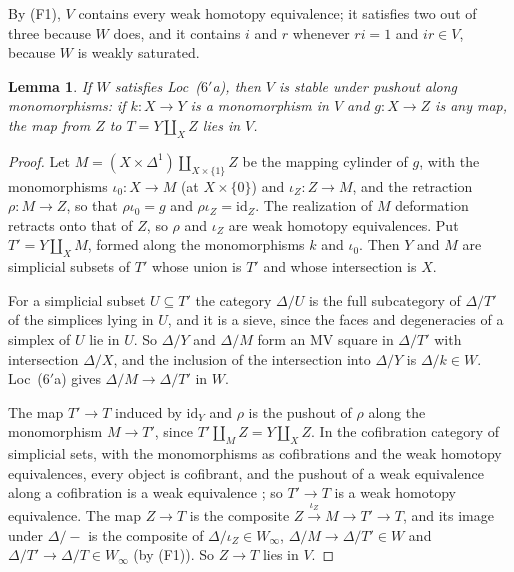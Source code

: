 \documentclass[11pt,a4paper]{article}
\newtheorem{lemma}[theorem]{Lemma}
\theoremstyle{definition}
\newcommand{\Winf}{W_{\infty}}
\newcommand{\id}{\mathrm{id}}
\begin{document}
By (F1), $V$ contains every weak homotopy equivalence; it satisfies two out of three because $W$
does, and it contains $i$ and $r$ whenever $ri=1$ and $ir\in V$, because $W$ is weakly
saturated.

\begin{lemma}\label{lem:pushout}
If $W$ satisfies Loc~\textup{($6'$a)}, then $V$ is stable under pushout along monomorphisms: if
$k\colon X\to Y$ is a monomorphism in $V$ and $g\colon X\to Z$ is any map, the map from $Z$ to
$T=Y\amalg_XZ$ lies in $V$.
\end{lemma}

\begin{proof}
Let $M=(X\times\Delta^1)\amalg_{X\times\{1\}}Z$ be the mapping cylinder of $g$, with the
monomorphisms $\iota_0\colon X\to M$ (at $X\times\{0\}$) and $\iota_Z\colon Z\to M$, and the
retraction $\rho\colon M\to Z$, so that $\rho\iota_0=g$ and $\rho\iota_Z=\id_Z$. The realization
of $M$ deformation retracts onto that of $Z$, so $\rho$ and $\iota_Z$ are weak homotopy
equivalences. Put $T'=Y\amalg_XM$, formed along the monomorphisms $k$ and $\iota_0$. Then $Y$ and
$M$ are simplicial subsets of $T'$ whose union is $T'$ and whose intersection is $X$.

For a simplicial subset $U\subseteq T'$ the category $\Delta/U$ is the full subcategory of
$\Delta/T'$ of the simplices lying in $U$, and it is a sieve, since the faces and degeneracies of
a simplex of $U$ lie in $U$. So $\Delta/Y$ and $\Delta/M$ form an MV square in $\Delta/T'$ with
intersection $\Delta/X$, and the inclusion of the intersection into $\Delta/Y$ is $\Delta/k\in W$.
Loc~($6'$a) gives $\Delta/M\to\Delta/T'$ in $W$.

The map $T'\to T$ induced by $\id_Y$ and $\rho$ is the pushout of $\rho$ along the monomorphism
$M\to T'$, since $T'\amalg_MZ=Y\amalg_XZ$. In the cofibration category of simplicial sets, with
the monomorphisms as cofibrations and the weak homotopy equivalences, every object is cofibrant,
and the pushout of a weak equivalence along a cofibration is a weak equivalence
\cite[Lemma~1.4.2]{RB09}; so $T'\to T$ is a weak homotopy equivalence. The map $Z\to T$ is the
composite $Z\xrightarrow{\iota_Z}M\to T'\to T$, and its image under $\Delta/-$ is the composite of
$\Delta/\iota_Z\in\Winf$, $\Delta/M\to\Delta/T'\in W$ and $\Delta/T'\to\Delta/T\in\Winf$ (by (F1)).
So $Z\to T$ lies in $V$.
\end{proof}
\end{document}
